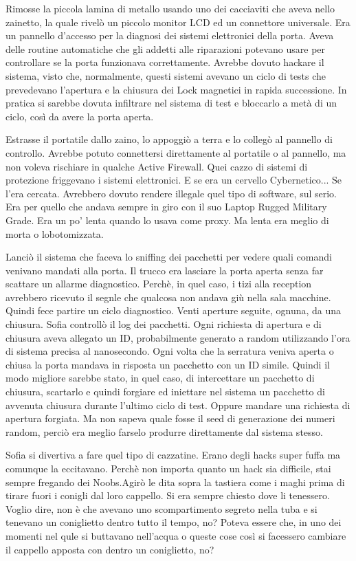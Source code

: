     Rimosse la piccola lamina di metallo usando uno dei cacciaviti che aveva nello zainetto, la quale rivelò un piccolo
    monitor LCD ed un connettore universale. Era un pannello d'accesso per la diagnosi dei sistemi elettronici della
    porta. Aveva delle routine automatiche che gli addetti alle riparazioni potevano usare per controllare se la porta
    funzionava correttamente. Avrebbe dovuto hackare il sistema, visto che, normalmente, questi sistemi avevano un ciclo
    di tests che prevedevano l'apertura e la chiusura dei Lock magnetici in rapida successione. In pratica si sarebbe
    dovuta infiltrare nel sistema di test e bloccarlo a metà di un ciclo, così da avere la porta aperta.

    Estrasse il portatile dallo zaino, lo appoggiò a terra e lo collegò al pannello di controllo. Avrebbe potuto
    connettersi direttamente al portatile o al pannello, ma non voleva rischiare in qualche Active Firewall. Quei cazzo
    di sistemi di protezione friggevano i sistemi elettronici. E se era un cervello Cybernetico... Se l'era cercata.
    Avrebbero dovuto rendere illegale quel tipo di software, sul serio. Era per quello che andava sempre in giro con il
    suo Laptop Rugged Military Grade. Era un po' lenta quando lo usava come proxy. Ma lenta era meglio di morta o
    lobotomizzata.

    Lanciò il sistema che faceva lo sniffing dei pacchetti per vedere quali comandi venivano mandati alla porta. Il
    trucco era lasciare la porta aperta senza far scattare un allarme diagnostico. Perchè, in quel caso, i tizi alla
    reception avrebbero ricevuto il segnle che qualcosa non andava giù nella sala macchine. Quindi fece partire un ciclo
    diagnostico. Venti aperture seguite, ognuna, da una chiusura. Sofia controllò il log dei pacchetti. Ogni richiesta
    di apertura e di chiusura aveva allegato un ID, probabilmente generato a random utilizzando l'ora di sistema precisa
    al nanosecondo. Ogni volta che la serratura veniva aperta o chiusa la porta mandava in risposta un pacchetto con
    un ID simile. Quindi il modo migliore sarebbe stato, in quel caso, di intercettare un pacchetto di chiusura,
    scartarlo e quindi forgiare ed iniettare nel sistema un pacchetto di avvenuta chiusura durante l'ultimo ciclo di test. Oppure mandare una
    richiesta di apertura forgiata. Ma non sapeva quale fosse il seed di generazione dei numeri random, perciò era
    meglio farselo produrre direttamente dal sistema stesso.

    Sofia si divertiva a fare quel tipo di cazzatine. Erano degli hacks super fuffa ma comunque la eccitavano. Perchè
    non importa quanto un hack sia difficile, stai sempre fregando dei Noobs.Agirò le dita sopra la tastiera come i
    maghi prima di tirare fuori i conigli dal loro cappello. Si era sempre chiesto dove li tenessero. Voglio dire, non è
    che avevano uno scompartimento segreto nella tuba e si tenevano un coniglietto dentro tutto il tempo, no? Poteva
    essere che, in uno dei momenti nel qule si buttavano nell'acqua o queste cose così si facessero cambiare il cappello
    apposta con dentro un coniglietto, no?


